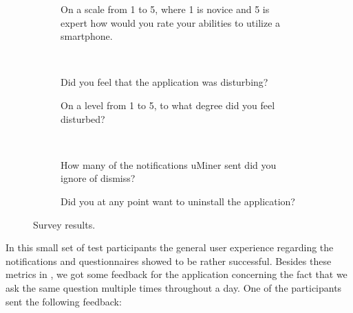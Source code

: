 \begin{figure}[!htbp]
    \begin{subfigure}[!t]{.45\textwidth}
      \centering
        
        \caption{On a scale from 1 to 5, where 1 is novice and 5 is expert how would you rate your abilities to utilize a smartphone.}
      \label{fig:smartphone_ability}
    \end{subfigure}
    ~
    \begin{subfigure}[!htbp]{.45\textwidth}
      \centering
        
      \caption{Did you feel that the application was disturbing?}
      \label{fig:general_disturbance}
    \end{subfigure}
    \vspace{1em}
    \begin{subfigure}[!htbp]{.45\textwidth}
      \centering
        
      \caption{On a level from 1 to 5, to what degree did you feel disturbed?}
      \label{fig:disturbance_level}
    \end{subfigure}
    ~
    \begin{subfigure}[!htbp]{.45\textwidth}
      \centering
        
      \caption{How many of the notifications uMiner sent did you ignore of dismiss?}
      \label{fig:ingore_notifications}
    \end{subfigure}
    \vspace{1em}
    \begin{subfigure}[!htbp]{\textwidth}
      \centering
        
      \caption{Did you at any point want to uninstall the application?}
      \label{fig:want_to_uninstall}
    \end{subfigure}
    \caption{Survey results.}
    \label{fig:survey_results}
    \end{figure}
\FloatBarrier

In this small set of test participants the general user experience regarding the notifications and questionnaires showed to be rather successful. Besides these metrics in , we got some feedback for the application concerning the fact that we ask the same question multiple times throughout a day. One of the participants sent the following feedback:


